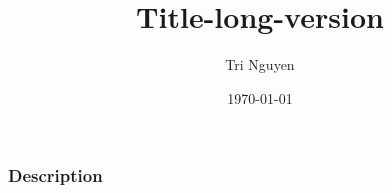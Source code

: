 \documentclass[10pt,xcolor={usenames,dvipsnames,table}]{beamer}
\title[Title]{Title-long-version}
\author{Tri Nguyen}
\institute[OSU] 
{
Oregon State University 
}
\date{\today} %
\begin{document}
\frame{\titlepage}

\begin{frame}
\frametitle{Description}
\end{frame}
\end{document}
